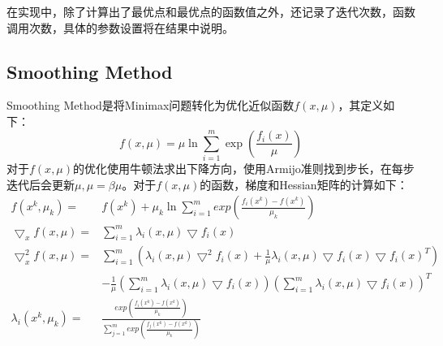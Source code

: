 \documentclass{ctexart}
\begin{document}
在实现中，除了计算出了最优点和最优点的函数值之外，还记录了迭代次数，函数调用次数，具体的参数设置将在结果中说明。
\subsection{Smoothing Method}
Smoothing Method是将Minimax问题转化为优化近似函数$f(x,\mu)$，其定义如下：
\[f(x,\mu) = \mu\ln\sum_{i=1}^{m}{\exp(\frac{f_i(x)}{\mu})}\]
对于$f(x,\mu)$的优化使用牛顿法求出下降方向，使用Armijo准则找到步长，在每步迭代后会更新$\mu, \mu = \beta\mu$。对于$f(x,\mu)$的函数，梯度和Hessian矩阵的计算如下：
$$
\begin{aligned}
	f(x^k,\mu_k)=&f(x^k)+\mu_k\ln\sum_{i=1}^{m}{exp(\frac{f_i(x^k)-f(x^k)}{\mu_k})}\\
	\bigtriangledown_xf(x,\mu)=&\sum_{i=1}^m{\lambda_i(x,\mu)\bigtriangledown f_i(x)}\\
\bigtriangledown^2_xf(x,\mu)=&\sum_{i=1}^m(\lambda_i(x,\mu)\bigtriangledown^2f_i(x)+\frac{1}{\mu}\lambda_i(x,\mu)\bigtriangledown f_i(x)\bigtriangledown f_i(x)^T)\\
			& -\frac{1}{\mu}(\sum_{i=1}^{m}\lambda_i(x,\mu)\bigtriangledown f_i(x))(\sum_{i=1}^m{\lambda_i(x,\mu)\bigtriangledown f_i(x)})^T\\
	\lambda_i(x^k,\mu_k) =& \frac{exp(\frac{f_i(x^k)-f(x^k)}{\mu_k})}{\sum_{j=1}^{m}{exp(\frac{f_j(x^k)-f(x^k)}{\mu_k})}}
\end{aligned}
$$
\end{document}
